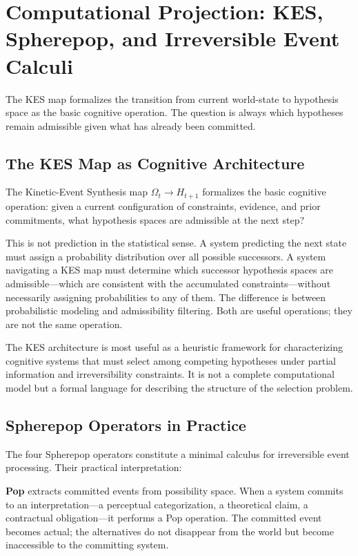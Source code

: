 \chapter{Computational Projection: KES, Spherepop, and Irreversible Event Calculi}
\label{ch:kes_spherepop}

\epigraph{The KES map formalizes the transition from current world-state to
hypothesis space as the basic cognitive operation. The question is always which
hypotheses remain admissible given what has already been committed.}{}

\section{The KES Map as Cognitive Architecture}

The Kinetic-Event Synthesis map $\Omega_t \to H_{t+1}$ formalizes the basic
cognitive operation: given a current configuration of constraints, evidence, and
prior commitments, what hypothesis spaces are admissible at the next step?

This is not prediction in the statistical sense. A system predicting the next
state must assign a probability distribution over all possible successors. A
system navigating a KES map must determine which successor hypothesis spaces
are admissible---which are consistent with the accumulated constraints---without
necessarily assigning probabilities to any of them. The difference is between
probabilistic modeling and admissibility filtering. Both are useful operations;
they are not the same operation.

\claimH The KES architecture is most useful as a heuristic framework for
characterizing cognitive systems that must select among competing hypotheses under
partial information and irreversibility constraints. It is not a complete
computational model but a formal language for describing the structure of the
selection problem.

\section{Spherepop Operators in Practice}

The four Spherepop operators constitute a minimal calculus for irreversible event
processing. Their practical interpretation:

\textbf{Pop} extracts committed events from possibility space. When a system
commits to an interpretation---a perceptual categorization, a theoretical claim,
a contractual obligation---it performs a Pop operation. The committed event
becomes actual; the alternatives do not disappear from the world but become
inaccessible to the committing system.

